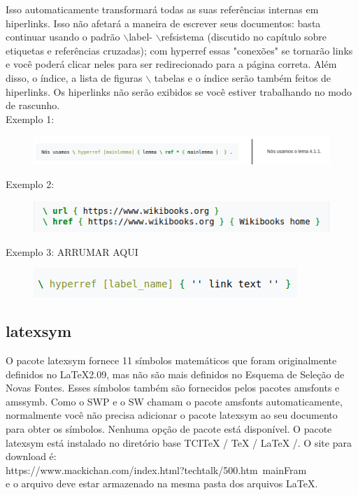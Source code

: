 \documentclass[12pt]{article}
\begin{document}
			Isso automaticamente transformará todas as suas referências internas em hiperlinks. Isso não afetará a maneira de escrever seus documentos: basta continuar usando o padrão $\backslash$label- $\backslash$refsistema (discutido no capítulo sobre etiquetas e referências cruzadas); com hyperref essas "conexões" se tornarão links e você poderá clicar neles para ser redirecionado para a página correta. Além disso, o índice, a lista de figuras $\backslash$ tabelas e o índice serão também feitos de hiperlinks. Os hiperlinks não serão exibidos se você estiver trabalhando no modo de rascunho.\\
			Exemplo 1:
			\begin{figure}[h]
				\centering
				\includegraphics[scale=0.5]{ref.png}
			\end{figure}
		
			Exemplo 2: 
			\begin{figure}[h]
				\centering
				\includegraphics[scale=0.6]{si.png}
			\end{figure}
		
			Exemplo 3: ARRUMAR AQUI
			
			
			
			
			
			
			
			
			
			
			
			
			
			
			\begin{figure}[h]
				\centering
				\includegraphics[scale=0.6]{f.png}
			\end{figure}
		
		\subsection{latexsym}
			O pacote latexsym fornece 11 símbolos matemáticos que foram originalmente definidos no LaTeX2.09, mas não são mais definidos no Esquema de Seleção de Novas Fontes. 
			Esses símbolos também são fornecidos pelos pacotes amsfonts e amssymb. Como o SWP e o SW chamam o pacote amsfonts automaticamente, normalmente você não precisa adicionar o pacote latexsym ao seu documento para obter os símbolos. Nenhuma opção de pacote está disponível. O pacote latexsym está instalado no diretório base TCITeX / TeX / LaTeX /. O site para download é:\\
			https://www.mackichan.com/index.html?techtalk/500.htm~mainFram\\ e o arquivo deve estar armazenado na mesma pasta dos arquivos LaTeX.
		
\end{document}
